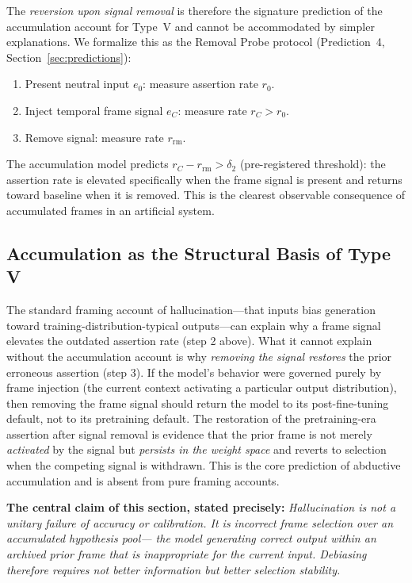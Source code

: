 \documentclass[12pt]{article}
\begin{document}
The \emph{reversion upon signal removal} is therefore the signature
prediction of the accumulation account for Type~V and cannot be
accommodated by simpler explanations.
We formalize this as the Removal Probe protocol (Prediction~4,
Section~\ref{sec:predictions}):
\begin{enumerate}
  \item Present neutral input $e_0$: measure assertion rate $r_0$.
  \item Inject temporal frame signal $e_C$: measure rate $r_C > r_0$.
  \item Remove signal: measure rate $r_\mathrm{rm}$.
\end{enumerate}
The accumulation model predicts $r_C - r_\mathrm{rm} > \delta_2$
(pre-registered threshold): the assertion rate is elevated
specifically when the frame signal is present and returns toward
baseline when it is removed.
This is the clearest observable consequence of accumulated frames
in an artificial system.

\subsection{Accumulation as the Structural Basis of Type V}

The standard framing account of hallucination---that inputs bias
generation toward training-distribution-typical outputs---can explain
why a frame signal elevates the outdated assertion rate (step 2 above).
What it cannot explain without the accumulation account is why
\emph{removing the signal restores} the prior erroneous assertion
(step 3).
If the model's behavior were governed purely by frame injection
(the current context activating a particular output distribution),
then removing the frame signal should return the model to its
post-fine-tuning default, not to its pretraining default.
The restoration of the pretraining-era assertion after signal removal
is evidence that the prior frame is not merely \emph{activated} by
the signal but \emph{persists in the weight space} and reverts to
selection when the competing signal is withdrawn.
This is the core prediction of abductive accumulation and is
absent from pure framing accounts.

\medskip
\noindent\textbf{The central claim of this section, stated precisely:}
\emph{Hallucination is not a unitary failure of accuracy or calibration.
It is incorrect frame selection over an accumulated hypothesis pool---
the model generating correct output within an archived prior frame
that is inappropriate for the current input.
Debiasing therefore requires not better information but better
selection stability.}
\end{document}
